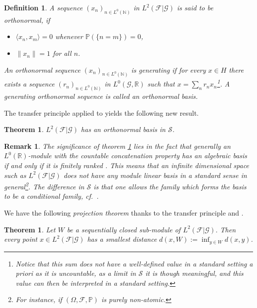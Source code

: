 \documentclass{jloganal}
\numberwithin{equation}{section}
\theoremstyle{plain}
\newtheorem{theorem}[subsection]{Theorem}
\newtheorem{definition}[subsection]{Definition}
\newtheorem{remark}[subsection]{Remark}
\renewcommand\R{\mathbb{R}}
\newcommand\N{\mathbb{N}}
\newcommand\F{\mathcal{F}}
\begin{document}
\begin{definition}
A sequence $(x_n)_{n\in L^0(\N)}$ in $L^2(\mathcal{F}|\mathcal{G})$  is said to be \emph{orthonormal}, if
\begin{itemize}
\item $\langle x_n,x_m\rangle=0$ whenever $\mathbb{P}(\{n=m\})=0$,
\item $\|x_n\|=1$ for all $n$.
\end{itemize}  
An orthonormal sequence $(x_n)_{n\in L^0(\mathbb{N})}$ is \emph{generating} if for every $x\in H$ there exists a sequence $(r_n)_{n\in L^0(\N)}$ in $L^0(\mathcal{G},\mathbb{R})$ such that $x=\sum_n r_n x_n$\footnote{Notice that this sum does not have a well-defined value in a standard setting a priori as it is uncountable, as a limit in $\mathcal{S}$ it is though meaningful, and this value can then be interpreted in a standard setting.}.  
A generating orthonormal sequence is called an \emph{orthonormal basis}.  
\end{definition}
The transfer principle applied to \cite[Theorem 10.9]{avigad2006fundamental} yields the following new result. 
\begin{theorem}\label{t:onb}
$L^2(\mathcal{F}|\mathcal{G})$ has an orthonormal basis in $\mathcal{S}$. 
\end{theorem}

\begin{remark}
The significance of theorem \ref{t:onb} lies in the fact that generally an $L^0(\R)$-module with the countable concatenation property has an algebraic basis if and only if it is finitely ranked \cite[Proposition 3.5]{jamneshan2017compact}. 
This means that an infinite dimensional space such as $L^2(\mathcal{F}|\mathcal{G})$ does not have any module linear basis in a standard sense in general\footnote{For instance, if $(\Omega,\F,\mathbb{P})$ is purely non-atomic.}. 
The difference in $\mathcal{S}$ is that one allows the family which forms the basis to be a conditional family, cf.~\cite[Section 3]{jamneshan2017compact}. 
\end{remark}

We have the following \emph{projection theorem} thanks to the transfer principle and \cite[Theorem 12.5]{avigad2006fundamental}. 

\begin{theorem}
Let $W$ be a sequentially closed sub-module of $L^2(\mathcal{F}|\mathcal{G})$.   
Then every point $x\in L^2(\mathcal{F}|\mathcal{G})$ has a smallest distance $d(x,W):=\inf_{y\in W} d(x,y)$.   
\end{theorem}
\end{document}

